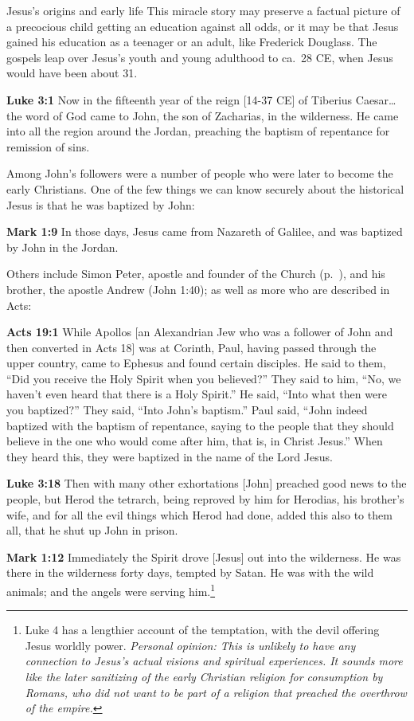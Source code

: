\documentclass[10pt,twoside]{article} %
\newcommand{\quotesize}{\normalsize{}}
\newcommand{\comm}[1]{\begingroup \color{black!50} #1\endgroup}
\newenvironment{quotetext}{\begingroup\quotesize}{\endgroup}
\newcommand{\bible}[2]{\begin{quotetext}\textbf{#1} #2\end{quotetext}}
\newcommand{\gospelmark}[2]{\bible{Mark #1}{#2}}
\newcommand{\luke}[2]{\bible{Luke #1}{#2}}
\newcommand{\personal}[1]{\emph{Personal opinion:\/ #1}}
\begin{document}
\begin{section}{Jesus's origins and early life}
\comm{
This miracle story may preserve a factual picture of a precocious child getting an education against all odds, or
it may be that Jesus gained his education as a teenager or an adult, like Frederick Douglass. The gospels leap
over Jesus's youth and young adulthood to ca.~28 CE, when Jesus would have been about 31.
}

\luke{3:1}{Now in the fifteenth year of the reign [14-37 CE] of Tiberius
Caesar\ldots the word of God came to John, the son of Zacharias, in
the wilderness.  He came into all the region around the Jordan,
preaching the baptism of repentance for remission of sins.}

\comm{
Among John's followers were a number of people who were later to become the early Christians.
One of the few things we can know securely about the historical Jesus is that he was baptized
by John:
}

\gospelmark{1:9}{In those days, Jesus came from Nazareth of Galilee, and was baptized by John in the Jordan.}

\comm{Others include Simon Peter, apostle and founder of the Church (p.~\pageref{peter-called}), and his brother, the apostle Andrew (John 1:40);
 as well as more who are described in Acts:}

\bible{Acts 19:1}{While Apollos [an Alexandrian Jew who was a follower of John and then converted in Acts 18] was at Corinth, Paul, having passed through the upper country, came to Ephesus and found certain disciples. He said to them, “Did you receive the Holy Spirit when you believed?”
They said to him, ``No, we haven’t even heard that there is a Holy Spirit.''
 He said, ``Into what then were you baptized?''
They said, ``Into John’s baptism.''
 Paul said, ``John indeed baptized with the baptism of repentance, saying to the people that they should believe in the one who would come after him, that is, in Christ Jesus.''
 When they heard this, they were baptized in the name of the Lord Jesus.}

\luke{3:18}{Then with many other exhortations [John] preached good news to the people, but Herod the tetrarch, being reproved by him for Herodias, his brother’s wife, and for all the evil things which Herod had done, added this also to them all, that he shut up John in prison.}

\gospelmark{1:12}{Immediately the Spirit drove [Jesus] out into the
wilderness. He was there in the wild\-erness forty days, tempted by
Satan. He was with the wild animals; and the angels were serving him.\footnote{Luke 4 has a lengthier account of
the temptation, with the devil offering Jesus worldly power. \personal{This is unlikely to have any connection to
Jesus's actual visions and spiritual experiences. It sounds more like the later sanitizing of the early
Christian religion for consumption by Romans, who did not want to be part of a religion that preached the overthrow
of the empire.}}}
\end{section}
\end{document}
